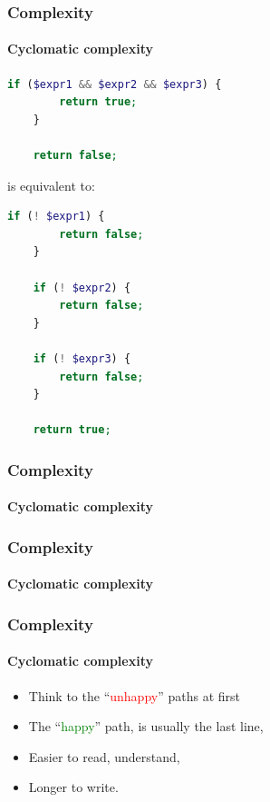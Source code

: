 \begin{frame}[fragile,c]
    \frametitle{Complexity}
    \framesubtitle{Cyclomatic complexity}

    \begin{lstlisting}[language=php]
    if ($expr1 && $expr2 && $expr3) {
        return true;
    }

    return false;
    \end{lstlisting}

    \pause

    is equivalent to:

    \begin{lstlisting}[language=php]
    if (! $expr1) {
        return false;
    }

    if (! $expr2) {
        return false;
    }

    if (! $expr3) {
        return false;
    }

    return true;
    \end{lstlisting}
\end{frame}

\begin{frame}
    \frametitle{Complexity}
    \framesubtitle{Cyclomatic complexity}

    
\end{frame}

\begin{frame}
    \frametitle{Complexity}
    \framesubtitle{Cyclomatic complexity}


\pause

\end{frame}

\begin{frame}
    \frametitle{Complexity}
    \framesubtitle{Cyclomatic complexity}

    \begin{itemize}[<+->]
        \item Think to the ``\textcolor{red}{unhappy}'' paths at first
        \item The ``\textcolor{green}{happy}'' path, is usually the last line,
        \item Easier to read, understand,
        \item Longer to write.
    \end{itemize}
\end{frame}

